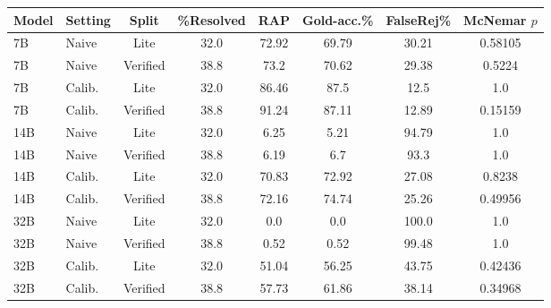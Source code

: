 \begin{tabular}{llcccccc}
\toprule
Model & Setting & Split & \%Resolved & RAP & Gold-acc.\% & FalseRej\% & McNemar $p$ \\
\midrule
7B & Naive & Lite & 32.0 & 72.92 & 69.79 & 30.21 & 0.58105 \\
7B & Naive & Verified & 38.8 & 73.2 & 70.62 & 29.38 & 0.5224 \\
7B & Calib. & Lite & 32.0 & 86.46 & 87.5 & 12.5 & 1.0 \\
7B & Calib. & Verified & 38.8 & 91.24 & 87.11 & 12.89 & 0.15159 \\
\midrule
14B & Naive & Lite & 32.0 & 6.25 & 5.21 & 94.79 & 1.0 \\
14B & Naive & Verified & 38.8 & 6.19 & 6.7 & 93.3 & 1.0 \\
14B & Calib. & Lite & 32.0 & 70.83 & 72.92 & 27.08 & 0.8238 \\
14B & Calib. & Verified & 38.8 & 72.16 & 74.74 & 25.26 & 0.49956 \\
\midrule
32B & Naive & Lite & 32.0 & 0.0 & 0.0 & 100.0 & 1.0 \\
32B & Naive & Verified & 38.8 & 0.52 & 0.52 & 99.48 & 1.0 \\
32B & Calib. & Lite & 32.0 & 51.04 & 56.25 & 43.75 & 0.42436 \\
32B & Calib. & Verified & 38.8 & 57.73 & 61.86 & 38.14 & 0.34968 \\
\bottomrule
\end{tabular}
